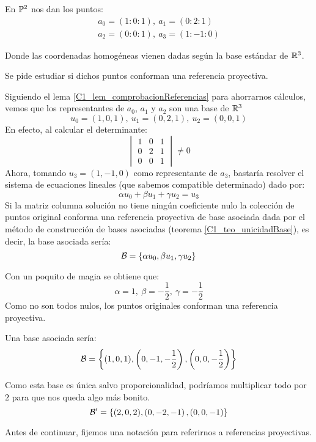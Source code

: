 \begin{exa}
	\label{C1_exa_basesAsociadas}
	En $\mathbb{P}^2$ nos dan los puntos: \begin{gather*}a_0=(1:0:1),\ a_1=(0:2:1)\\a_2=(0:0:1),\ a_3=(1:-1:0)
	\end{gather*}
	
	Donde las coordenadas homogéneas vienen dadas según la base estándar de $\mathbb{R}^3$.
	
	Se pide estudiar si dichos puntos conforman una referencia proyectiva.
	
	Siguiendo el lema \ref{C1_lem_comprobacionReferencias} para ahorrarnos cálculos, vemos que los representantes de $a_0$, $a_1$ y $a_2$ son una base de $\mathbb{R}^3$
		\begin{equation*}
		u_0=(1,0,1),\ u_1=(0,2,1),\ u_2=(0,0,1)
		\end{equation*}
	En efecto, al calcular el determinante:
	\[\begin{vmatrix}
	1 & 0 & 1\\
	0 & 2 & 1\\
	0 & 0 & 1
	\end{vmatrix}\not= 0\]
	Ahora, tomando $u_3=(1,-1,0)$ como representante de $a_3$, bastaría resolver el sistema de ecuaciones lineales (que sabemos compatible determinado) dado por:
	\[\alpha u_0+\beta u_1 + \gamma u_2 = u_3\]
	Si la matriz columna solución no tiene ningún coeficiente nulo la colección de puntos original conforma una referencia proyectiva de base asociada dada por el método de construcción de bases asociadas (teorema \ref{C1_teo_unicidadBase}), es decir, la base asociada sería:\[\mathcal{B}=\{\alpha u_0,\beta u_1, \gamma u_2\}\]
	
	Con un poquito de magia se obtiene que:\[\alpha = 1,\ \beta = -\frac{1}{2},\ \gamma = -\frac{1}{2}\]
	Como no son todos nulos, los puntos originales conforman una referencia proyectiva.
	
	Una base asociada sería:
	\[
	\mathcal{B}=\left\{(1,0,1), \left(0,-1,-\frac{1}{2}\right),\left(0,0,-\frac{1}{2}\right)\right\}
	\]
	
	Como esta base es única salvo proporcionalidad, podríamos multiplicar todo por $2$ para que nos queda algo más bonito.
	\[
	\mathcal{B}'=\left\{(2,0,2), \left(0,-2,-1\right),\left(0,0,-1\right)\right\}
	\]
\end{exa}
Antes de continuar, fijemos una notación para referirnos a referencias proyectivas.


